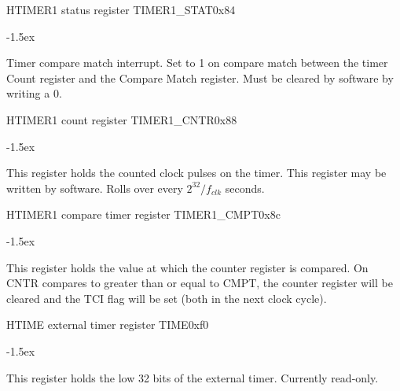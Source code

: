 \documentclass[12pt]{article}
\begin{document}
\begin{register}{H}{TIMER1 status register TIMER1\_STAT}{0x84}
\label{timer1stat}
%
%
%
\regnewline%
\end{register}
\begin{regdesc}[0.8\textwidth]\begin{reglist}[0000]
\itemsep-1.5ex
\item[TCI] Timer compare match interrupt. Set to 1 on compare match between the timer Count register and the Compare Match register. Must be cleared by software by writing a 0.
\end{reglist}\end{regdesc}

\begin{register}{H}{TIMER1 count register TIMER1\_CNTR}{0x88}
\label{timer1cntr}
%
\regnewline%
\end{register}
\begin{regdesc}[0.8\textwidth]\begin{reglist}[0000]
\itemsep-1.5ex
\item[CNTR] This register holds the counted clock pulses on the timer. This register may be written by software. Rolls over every $2^{32}/f_{clk}$ seconds.
\end{reglist}\end{regdesc}

\begin{register}{H}{TIMER1 compare timer register TIMER1\_CMPT}{0x8c}
\label{timer1cmpt}
%
\regnewline%
\end{register}
\begin{regdesc}[0.8\textwidth]\begin{reglist}[0000]
\itemsep-1.5ex
\item[CMPT] This register holds the value at which the counter register is compared. On CNTR compares to greater than or equal to CMPT, the counter register will be cleared and the TCI flag will be set (both in the next clock cycle).
\end{reglist}\end{regdesc}

\begin{register}{H}{TIME external timer register TIME}{0xf0}
\label{time}
%
\regnewline%
\end{register}
\begin{regdesc}[0.8\textwidth]\begin{reglist}[0000]
\itemsep-1.5ex
\item This register holds the low 32 bits of the external timer. Currently read-only.
\end{reglist}\end{regdesc}
\end{document}
